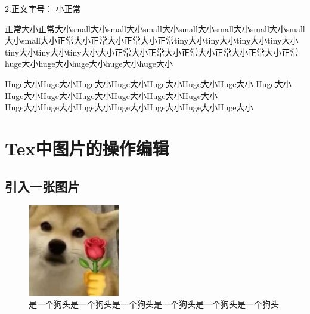 \documentclass[normalsize]{article}   %
\begin{document}
		\noindent 2.正文字号： 小正常
		
		正常大小正常大小\small{small大小small大小small大小small大小small大小small大小small大小small大小}正常大小正常大小正常大小正常\tiny{tiny大小tiny大小tiny大小tiny大小tiny大小tiny大小tiny大小}大小正常大小正常大小正常大小正常大小正常大小正常\huge{huge大小huge大小huge大小huge大小huge大小}
		
		
		 \Huge Huge大小Huge大小Huge大小Huge大小Huge大小Huge大小Huge大小
		 \normalsize
		 Huge大小Huge大小Huge大小Huge大小Huge大小Huge大小Huge大小\\
		 
		 
		 Huge大小Huge大小Huge大小Huge大小Huge大小Huge大小Huge大小
		 \\
		 
				
		\normalsize
		\newpage
	\section{Tex中图片的操作编辑}
		\subsection{引入一张图片}
		
		
		
			\begin{figure}[htbp!]
				\centering
				\includegraphics[height=4cm,width=4cm]{./img/sample.png}%
				\caption{是一个狗头是一个狗头是一个狗头是一个狗头是一个狗头是一个狗头}
				\label{fig:10}
			\end{figure}
		
		
		\newpage
\end{document}
